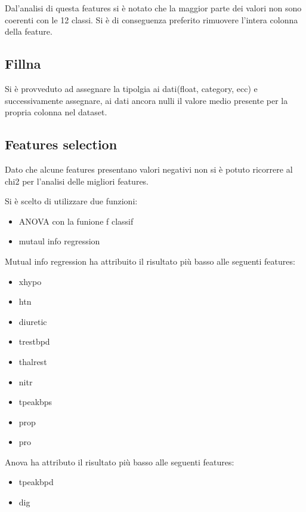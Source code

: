 \documentclass[a4paper]{article}
\begin{document}
    Dal'analisi di questa features si è notato che la maggior parte dei valori non sono coerenti con le 12 classi.
    Si è di conseguenza preferito rimuovere l'intera colonna della feature.
    

    \subsection{Fillna}
    Si è provveduto ad assegnare la tipolgia ai dati(float, category, ecc) e successivamente assegnare, ai dati ancora nulli il valore medio
    presente per la propria colonna nel dataset.

    \subsection{Features selection}
    Dato che alcune features presentano valori negativi non si è potuto ricorrere al chi2 per l'analisi delle migliori features.
    
    Si è scelto di utilizzare due funzioni:
    \begin{itemize}
        \item ANOVA con la funione f classif
        \item mutaul info regression
    \end{itemize}


    Mutual info regression ha attribuito il risultato più basso alle seguenti features:
    \begin{itemize}
        \item xhypo
        \item htn
        \item diuretic
        \item trestbpd
        \item thalrest
        \item nitr
        \item tpeakbps
        \item prop
        \item pro
    \end{itemize}


    Anova ha attributo il risultato più basso alle seguenti features:
    \begin{itemize}
        \item tpeakbpd
        \item dig
    \end{itemize}
\end{document}
